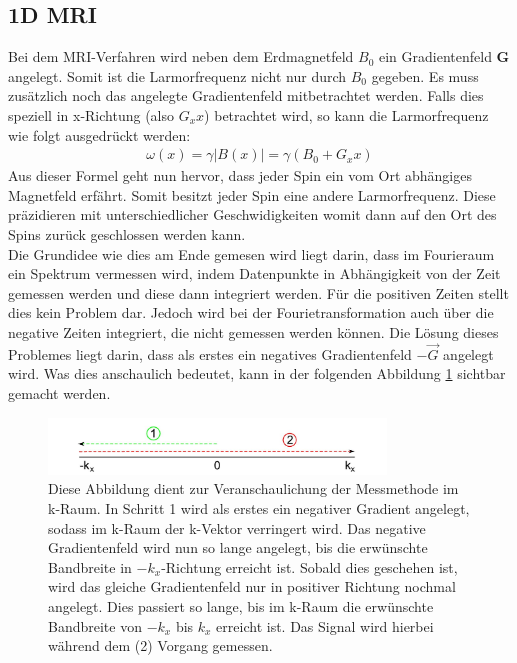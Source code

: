 \subsection{1D MRI}
\label{sec:1DMRIkapitel}
Bei dem MRI-Verfahren wird neben dem Erdmagnetfeld $B_0$ ein Gradientenfeld \textbf{G} angelegt.
Somit ist die Larmorfrequenz nicht nur durch $B_0$ gegeben.
Es muss zusätzlich noch das angelegte Gradientenfeld mitbetrachtet werden.
Falls dies speziell in x-Richtung (also $G_xx$) betrachtet wird, so kann die Larmorfrequenz wie folgt ausgedrückt werden\cite{Schmidt}:
\begin{align}
    \omega(x)=\gamma |B(x)|= \gamma \left(B_0+G_xx\right) \label{eq:gradientlarmor}
\end{align}
Aus dieser Formel geht nun hervor, dass jeder Spin ein vom Ort abhängiges Magnetfeld erfährt.
Somit besitzt jeder Spin eine andere Larmorfrequenz.
Diese präzidieren mit unterschiedlicher Geschwidigkeiten womit dann auf den Ort des Spins zurück geschlossen werden kann. \\

Die Grundidee wie dies am Ende gemesen wird liegt darin, dass im Fourieraum ein Spektrum vermessen wird, indem Datenpunkte in Abhängigkeit von der Zeit gemessen werden und diese dann integriert werden.
Für die positiven Zeiten stellt dies kein Problem dar.
Jedoch wird bei der Fourietransformation auch über die negative Zeiten integriert, die nicht gemessen werden können.
Die Lösung dieses Problemes liegt darin, dass als erstes ein negatives Gradientenfeld $-\vec{G}$ angelegt wird.
Was dies anschaulich bedeutet, kann in der folgenden Abbildung \ref{fig:1DMRI} sichtbar gemacht werden.  
\begin{figure}[H]
    \centering
    \includegraphics[width=0.8\textwidth]{Abbildungen/1DMRIkraum.JPG}
    \caption[Veranschaulichter Verlauf des k-Vektors im 1D-MRI]{Diese Abbildung dient zur Veranschaulichung der Messmethode im k-Raum.
    In Schritt 1 wird als erstes ein negativer Gradient angelegt, sodass im k-Raum der k-Vektor verringert wird.
    Das negative Gradientenfeld wird nun so lange angelegt, bis die erwünschte Bandbreite in $-k_{x}$-Richtung erreicht ist.
    Sobald dies geschehen ist, wird das gleiche Gradientenfeld nur in positiver Richtung nochmal angelegt.
    Dies passiert so lange,  bis im k-Raum die erwünschte Bandbreite von $-k_{x}$ bis $k_{x}$ erreicht ist.
    Das Signal wird hierbei während dem (2) Vorgang gemessen. \cite{Schmidt}}
    \label{fig:1DMRI}
\end{figure}

